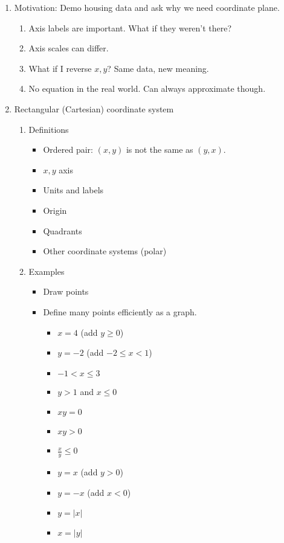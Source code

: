 \documentclass{article}
\begin{document}
\begin{enumerate}

\item Motivation: Demo housing data and ask why we need coordinate plane.
\begin{enumerate}
\item Axis labels are important. What if they weren't there?
\item Axis scales can differ. 
\item What if I reverse $x,y$? Same data, new meaning.
\item No equation in the real world. Can always approximate though.
\end{enumerate}

\item Rectangular (Cartesian) coordinate system
\begin{enumerate}
\item Definitions
\begin{itemize}
\item Ordered pair: $(x,y)$ is not the same as $(y,x)$. 
\item $x, y$ axis
\item Units and labels
\item Origin
\item Quadrants
\item Other coordinate systems (polar)
\end{itemize}

\item Examples
\begin{itemize}
\item Draw points
\item Define many points efficiently as a graph. 
\begin{itemize}
\item $x=4$ (add $y\geq 0$)
\item $y=-2$ (add $-2\leq x < 1$)
\item $-1< x \leq 3$
\item $y > 1$ and $x\leq 0$
\item $xy=0$
\item $xy > 0$
\item $\frac{x}{y} \leq 0$
\item $y=x$ (add $y>0$)
\item $y=-x$ (add $x<0$)
\item $y=|x|$
\item $x=|y|$
\end{itemize}
\end{itemize}
\end{enumerate}


\end{enumerate}
\end{document}
